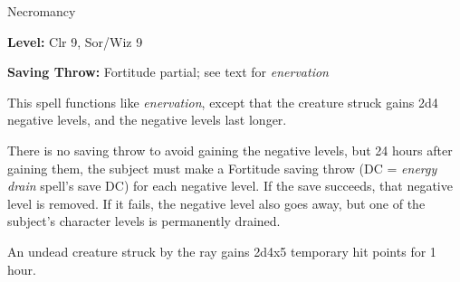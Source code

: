 
Necromancy

\textbf{Level:} Clr 9, Sor/Wiz 9

\textbf{Saving Throw:} Fortitude partial; see text for \textit{enervation}

This spell functions like \textit{enervation}, except that the creature struck 
gains 2d4 negative levels, and the negative levels last longer.

There is no saving throw to avoid gaining the negative levels, but 24 hours after 
gaining them, the subject must make a Fortitude saving throw (DC = \textit{energy 
drain} spell's save DC) for each negative level. If the save succeeds, that negative 
level is removed. If it fails, the negative level also goes away, but one of the 
subject's character levels is permanently drained.

An undead creature struck by the ray gains 2d4x5 temporary hit points for 1 hour.

